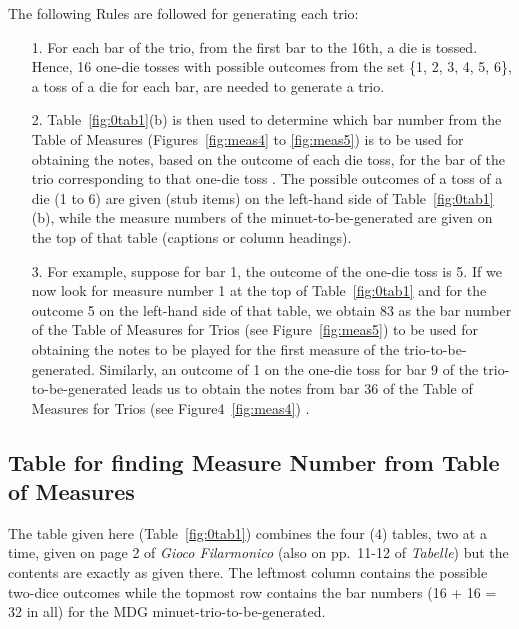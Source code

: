 \documentclass[a4paper,x11names,svgnames,10pt]{article}
\begin{document}
{The following Rules are followed for generating each trio:
\begin{enumerate}
	\item [1.] For each bar of the trio, from the first bar to the 16th, a die is tossed.  Hence, 16 one-die tosses with possible outcomes from the set \{1, 2, 3, 4, 5, 6\}, a toss of a die for each bar, are needed to generate a trio.   
	\item [2.] Table~\ref{fig:0tab1}(b) is then used to determine which bar number from the Table of Measures (Figures~\ref{fig:meas4} to \ref{fig:meas5}) is to be used for obtaining the notes, based on the outcome of each die toss, for the bar of the trio corresponding to that one-die toss .  The possible outcomes of a toss of a die (1 to 6) are given (stub items) on the left-hand side of Table~\ref{fig:0tab1}(b), while the measure numbers of the minuet-to-be-generated are given on the top of that table (captions or column  headings).
	\item [3.]  For example, suppose for bar 1, the outcome of the one-die toss is 5.  If we now look for measure number 1 at the top of Table~\ref{fig:0tab1} and for the outcome 5 on the left-hand side of that table, we obtain 83 as the bar number of the Table of Measures for Trios (see Figure~\ref{fig:meas5}) to be used for obtaining the notes to be played for the first measure of the trio-to-be-generated.  Similarly, an outcome of 1 on the one-die toss for bar 9 of the trio-to-be-generated leads us to obtain the notes from bar 36 of the Table of Measures for Trios (see Figure4~\ref{fig:meas4}) .
\end{enumerate}   

\subsection{Table for finding Measure Number from Table of Measures}\label{tableFind}
The table given here (Table~\ref{fig:0tab1}) combines the four (4) tables, two at a time, given on page 2 of {\it Gioco Filarmonico} (also on pp.\ 11-12 of {\it Tabelle}) but the contents are exactly as given there.  The leftmost column contains the possible two-dice outcomes while the topmost row contains the bar numbers (16 + 16 = 32 in all) for the MDG minuet-trio-to-be-generated.

}
\end{document}
